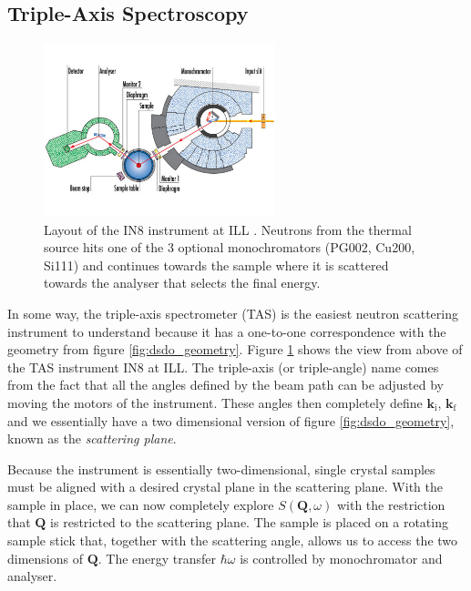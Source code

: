 
\subsection{Triple-Axis Spectroscopy}

\begin{figure}
	\centering
	\includegraphics[width=0.6\textwidth]{fig/method/ns/in8.jpg}
	\caption[in8 layout]{Layout of the IN8 instrument at ILL \cite{in8}. Neutrons from the thermal source hits one of the 3 optional monochromators (PG002, Cu200, Si111) and continues towards the sample where it is scattered towards the analyser that selects the final energy.}
	\label{fig:in8}
\end{figure}

In some way, the triple-axis spectrometer (TAS) is the easiest neutron scattering instrument to understand because it has a one-to-one correspondence with the geometry from figure \ref{fig:dsdo_geometry}. Figure \ref{fig:in8} shows the view from above of the TAS instrument IN8 at ILL. The triple-axis (or triple-angle) name comes from the fact that all the angles defined by the beam path can be adjusted by moving the motors of the instrument. These angles then completely define $\bm{k}_\text{i}$, $\bm{k}_\text{f}$ and we essentially have a two dimensional version of figure \ref{fig:dsdo_geometry}, known as the \emph{scattering plane}.

Because the instrument is essentially two-dimensional, single crystal samples must be aligned with a desired crystal plane in the scattering plane. With the sample in place, we can now completely explore $S(\bm{Q},\omega)$ with the restriction that $\bm{Q}$ is restricted to the scattering plane. The sample is placed on a rotating sample stick that, together with the scattering angle, allows us to access the two dimensions of $\bm{Q}$. The energy transfer $\hbar\omega$ is controlled by monochromator and analyser.

